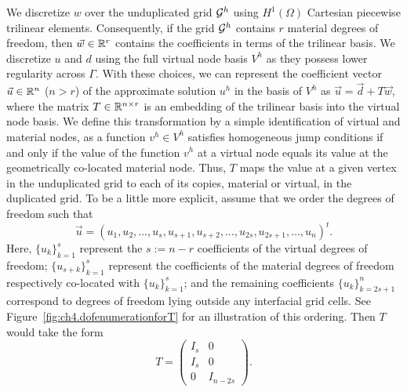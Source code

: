We discretize $w$ over the unduplicated grid $\mathcal{G}^h$ using $H^1(\Omega)$ Cartesian piecewise trilinear elements. Consequently, if the grid $\mathcal{G}^h$ contains $r$ material degrees of freedom, then $\vec{w} \in \mathbb{R}^r$ contains the coefficients in terms of the trilinear basis. We discretize $u$ and $d$ using the full virtual node basis $V^h$ as they possess lower regularity across $\Gamma$. With these choices, we can represent the coefficient vector $\vec{u} \in \mathbb{R}^n$ ($n > r$) of the approximate solution $u^h$ in the basis of $V^h$ as $\vec{u} = \vec{d} + T \vec{w}$, where the matrix $T \in \mathbb{R}^{n \times r}$ is an embedding of the trilinear basis into the virtual node basis. We define this transformation by a simple identification of virtual and material nodes, as a function $v^h \in V^h$ satisfies homogeneous jump conditions if and only if the value of the function $v^h$ at a virtual node equals its value at the geometrically co-located material node. Thus, $T$ maps the value at a given vertex in the unduplicated grid to each of its copies, material or virtual, in the duplicated grid. To be a little more explicit, assume that we order the degrees of freedom such that
\begin{equation*}
\vec{u} = (u_1, u_2, \dotsc, u_s, u_{s+1}, u_{s+2}, \dotsc, u_{2s}, u_{2s+1}, \dotsc, u_n)^t.
\end{equation*}
Here, $\{u_k\}_{k=1}^s$ represent the $s := n - r$ coefficients of the virtual degrees of freedom; $\{u_{s+k}\}_{k=1}^s$ represent the coefficients of the material degrees of freedom respectively co-located with $\{u_k\}_{k=1}^s$; and the remaining coefficients $\{u_k\}_{k=2s+1}^n$ correspond to degrees of freedom lying outside any interfacial grid cells. See Figure~\ref{fig:ch4.dofenumerationforT} for an illustration of this ordering. Then $T$ would take the form
\begin{equation} \label{eq:ch4.interface.T}
T = \begin{pmatrix} I_s & 0 \\ I_s & 0  \\ 0 & I_{n-2s} \end{pmatrix}.
\end{equation}

